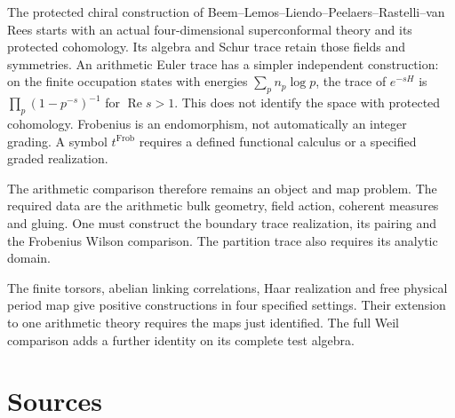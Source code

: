 The protected chiral construction of
Beem--Lemos--Liendo--Peelaers--Rastelli--van Rees starts with an actual
four-dimensional superconformal theory and its protected cohomology. Its
algebra and Schur trace retain those fields and symmetries. An arithmetic
Euler trace has a simpler independent construction: on the finite occupation
states with energies \(\sum_pn_p\log p\), the trace of \(e^{-sH}\) is
\(\prod_p(1-p^{-s})^{-1}\) for \(\operatorname{Re}s>1\). This does not
identify the space with protected cohomology. Frobenius is an endomorphism,
not automatically an integer grading. A symbol \(t^{\operatorname{Frob}}\)
requires a defined functional calculus or a specified graded realization.

The arithmetic comparison therefore remains an object and map problem. The
required data are the arithmetic bulk geometry, field action, coherent
measures and gluing. One must construct the boundary trace realization, its
pairing and the Frobenius Wilson comparison. The partition trace also
requires its analytic domain.

The finite torsors, abelian linking correlations, Haar realization and free
physical period map give positive constructions in four specified settings.
Their extension to one arithmetic theory requires the maps just identified.
The full Weil comparison adds a further identity on its complete test
algebra.

\section*{Sources}

